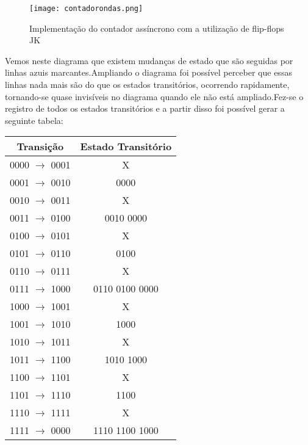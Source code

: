 \documentclass[12pt]{article}
\begin{document}
	\begin{figure}[H]
		\centering
		\texttt{[image: contadorondas.png]}
		\caption{Implementação do contador assíncrono com a utilização de flip-flops JK}
		\label{fig:contadorondas}
	\end{figure}
	
	Vemos neste diagrama que existem mudanças de estado que são seguidas por linhas azuis marcantes.Ampliando o diagrama foi possível perceber que essas linhas nada mais são do que os estados transitórios, ocorrendo rapidamente, tornando-se quase invisíveis no diagrama quando ele não está ampliado.Fez-se o registro de todos os estados transitórios e a partir disso foi possível gerar a seguinte tabela:
	
		\begin{table}[H]
			\centering
			\begin{tabular}{|c|c|}
				\cline{1-2}
				\multicolumn{1}{|c|}{Transição} & \multicolumn{1}{|c|}{Estado Transitório}\\
				\hline
				0000 $\rightarrow $ 0001  & X \\
				\hline
				0001 $\rightarrow $ 0010  & 0000  \\
				\hline
				0010 $\rightarrow $ 0011  & X \\
				\hline
				0011 $\rightarrow $ 0100  & 0010 0000  \\
				\hline
				0100 $\rightarrow $ 0101  & X \\
				\hline
				0101 $\rightarrow $ 0110  & 0100  \\
				\hline
				0110 $\rightarrow $ 0111  & X \\
				\hline
				0111 $\rightarrow $ 1000  & 0110 0100 0000  \\
				\hline
				1000 $\rightarrow $ 1001  & X \\
				\hline
				1001 $\rightarrow $ 1010  & 1000  \\
				\hline
				1010 $\rightarrow $ 1011  & X \\
				\hline
				1011 $\rightarrow $ 1100  & 1010 1000  \\
				\hline
				1100 $\rightarrow $ 1101  & X \\
				\hline
				1101 $\rightarrow $ 1110  & 1100  \\
				\hline
				1110 $\rightarrow $ 1111  & X \\
				\hline
				1111 $\rightarrow $ 0000  & 1110 1100 1000  \\
				\hline
			\end{tabular}
		\end{table}
	
\end{document}
